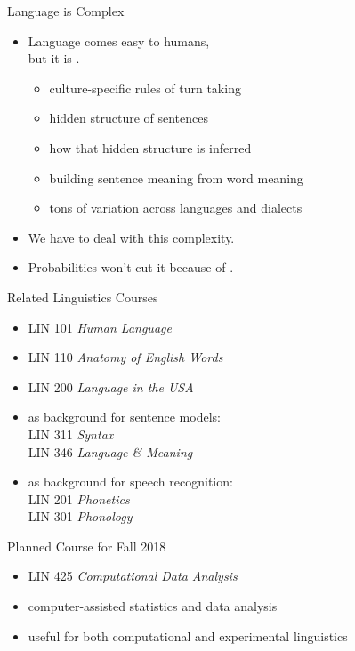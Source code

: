 \documentclass[xcolor={usenames,svgnames,x11names,dvipsnames,table}]{beamer}
\begin{document}
\begin{frame}{Language is Complex}
    \begin{itemize}
        \item Language comes easy to humans,\\
            but it is .
            \begin{itemize}
                \item culture-specific rules of turn taking
                \item hidden structure of sentences
                \item how that hidden structure is inferred
                \item building sentence meaning from word meaning
                \item tons of variation across languages and dialects
            \end{itemize}
        \item We have to deal with this complexity.
        \item Probabilities won't cut it because of .
    \end{itemize}
\end{frame}

\begin{frame}{Related Linguistics Courses}
    \begin{itemize}
        \item LIN 101 \emph{Human Language}\\
        \item LIN 110 \emph{Anatomy of English Words}\\
        \item LIN 200 \emph{Language in the USA}\\
        \item as background for sentence models:\\
            LIN 311 \emph{Syntax}\\
            LIN 346 \emph{Language \& Meaning}\\
        \item as background for speech recognition:\\
            LIN 201 \emph{Phonetics}\\
            LIN 301 \emph{Phonology}
    \end{itemize}

    \pause
    \begin{block}{Planned Course for Fall 2018}
        \begin{itemize}
            \item LIN 425 \emph{Computational Data Analysis}
            \item computer-assisted statistics and data analysis
            \item useful for both computational and experimental linguistics
        \end{itemize}
    \end{block}
\end{frame}
\end{document}
